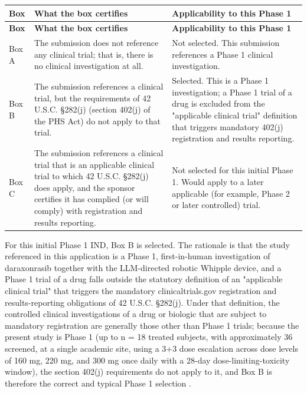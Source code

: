 \begin{center}
\begin{xltabular}{\textwidth}{>{\raggedright\arraybackslash}p{1.5cm} Y >{\raggedright\arraybackslash}p{4.2cm}}
\toprule
\textbf{Box} & \textbf{What the box certifies} & \textbf{Applicability to this Phase 1} \\
\midrule
\endfirsthead
\toprule
\textbf{Box} & \textbf{What the box certifies} & \textbf{Applicability to this Phase 1} \\
\midrule
\endhead
\bottomrule
\endfoot
Box A & The submission does not reference any clinical trial; that is, there is no clinical investigation at all. & Not selected. This submission references a Phase 1 clinical investigation. \\
Box B & The submission references a clinical trial, but the requirements of 42 U.S.C. \S 282(j) (section 402(j) of the PHS Act) do not apply to that trial. & Selected. This is a Phase 1 investigation; a Phase 1 trial of a drug is excluded from the "applicable clinical trial" definition that triggers mandatory 402(j) registration and results reporting. \\
Box C & The submission references a clinical trial that is an applicable clinical trial to which 42 U.S.C. \S 282(j) does apply, and the sponsor certifies it has complied (or will comply) with registration and results reporting. & Not selected for this initial Phase 1. Would apply to a later applicable (for example, Phase 2 or later controlled) trial. \\
\bottomrule
\end{xltabular}
\end{center}

For this initial Phase 1 IND, Box B is selected. The rationale is that
the study referenced in this application is a Phase 1, first-in-human
investigation of daraxonrasib together with the LLM-directed robotic
Whipple device, and a Phase 1 trial of a drug falls outside the
statutory definition of an "applicable clinical trial" that triggers the
mandatory clinicaltrials.gov registration and results-reporting
obligations of 42 U.S.C. \S 282(j). Under that definition, the
controlled clinical investigations of a drug or biologic that are subject
to mandatory registration are generally those other than Phase 1 trials;
because the present study is Phase 1 (up to n = 18 treated subjects, with
approximately 36 screened, at a single academic site, using a 3+3 dose
escalation across dose levels of 160 mg, 220 mg, and 300 mg once daily
with a 28-day dose-limiting-toxicity window), the section 402(j)
requirements do not apply to it, and Box B is therefore the correct and
typical Phase 1 selection \cite{phase1guidance, oncotrialllm}.

